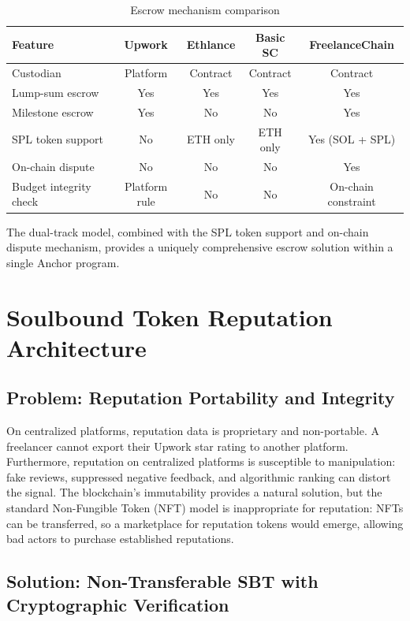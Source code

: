 \begin{table}[H]
\centering
\caption{Escrow mechanism comparison}
\label{table:escrow_comparison}
\begin{tabular}{|l|c|c|c|c|}
\hline
\textbf{Feature} & \textbf{Upwork} & \textbf{Ethlance} & \textbf{Basic SC} & \textbf{FreelanceChain} \\ \hline
Custodian & Platform & Contract & Contract & Contract \\ \hline
Lump-sum escrow & Yes & Yes & Yes & Yes \\ \hline
Milestone escrow & Yes & No & No & Yes \\ \hline
SPL token support & No & ETH only & ETH only & Yes (SOL + SPL) \\ \hline
On-chain dispute & No & No & No & Yes \\ \hline
Budget integrity check & Platform rule & No & No & On-chain constraint \\ \hline
\end{tabular}
\end{table}

The dual-track model, combined with the SPL token support and on-chain dispute mechanism, provides a uniquely comprehensive escrow solution within a single Anchor program.

\section{Soulbound Token Reputation Architecture}
\label{section:5.2}

\subsection{Problem: Reputation Portability and Integrity}

On centralized platforms, reputation data is proprietary and non-portable. A freelancer cannot export their Upwork star rating to another platform. Furthermore, reputation on centralized platforms is susceptible to manipulation: fake reviews, suppressed negative feedback, and algorithmic ranking can distort the signal. The blockchain's immutability provides a natural solution, but the standard Non-Fungible Token (NFT) model is inappropriate for reputation: NFTs can be transferred, so a marketplace for reputation tokens would emerge, allowing bad actors to purchase established reputations.

\subsection{Solution: Non-Transferable SBT with Cryptographic Verification}

